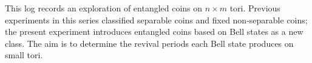 This log records an exploration of entangled coins on $n \times m$
tori. Previous experiments in this series classified separable coins
and fixed non-separable coins; the present experiment introduces
entangled coins based on Bell states as a new class. The aim is to
determine the revival periods each Bell state produces on small tori.
